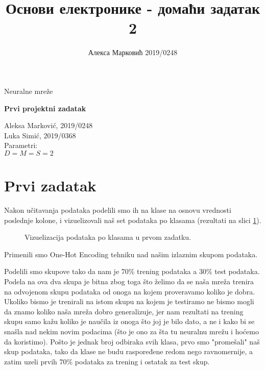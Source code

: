 \documentclass[10pt,a4paper,titlepage,croatian]{article}
\author{Алекса Марковић 2019/0248}
\title{Основи електронике - домаћи задатак 2}
\begin{document}
\lstset{language=Python,breaklines=true} 
\begin{titlepage}
\begin{center}
{\Large Neuralne mreže \par}
\begin{huge}
\sc\textbf{Prvi projektni zadatak}
\par
\end{huge}
\vspace{1cm}
\begin{large}
Aleksa Marković, 2019/0248 \\
Luka Simić, 2019/0368
\\
\vspace{1cm}
Parametri:\\
\vspace{0.5cm}
$D = M = S = 2$
\end{large}
\end{center}

\end{titlepage}

\section{Prvi zadatak}
Nakon učitavanja podataka podelili smo ih na klase na osnovu vrednosti poslednje kolone, i vizuelizovali naš set podataka po klasama (rezultati na slici \ref{Vis1Klase}).
\begin{figure}
    \centering
    
    \caption{Vizuelizacija podataka po klasama u prvom zadatku.}
    \label{Vis1Klase}
\end{figure}
Primenili smo One-Hot Encoding tehniku nad našim izlaznim skupom podataka.

Podelili smo skupove tako da nam je 70\% trening podataka a 30\% test podataka. Podela na ova dva skupa je bitna zbog toga što želimo da se naša mreža trenira na odvojenom skupu podataka od onoga na kojem proveravamo koliko je dobra. Ukoliko bismo je trenirali na istom skupu na kojem je testiramo ne bismo mogli da znamo koliko naša mreža dobro generalizuje, jer nam rezultati na trening skupu samo kažu koliko je naučila iz onoga što joj je bilo dato, a ne i kako bi se snašla nad nekim novim podacima (što je ono za šta tu neuralnu mrežu i hoćemo da koristimo). Pošto je jednak broj odbiraka svih klasa, prvo smo "promešali" naš skup podataka, tako da klase ne budu raspoređene redom nego ravnomernije, a zatim uzeli prvih 70\% podataka za trening i ostatak za test skup.
\end{document}
